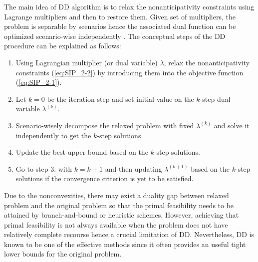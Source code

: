 The main idea of DD algorithm is to relax the nonanticipativity constraints using Lagrange multipliers and then to restore them. Given set of multipliers, the problem is separable by scenarios hence the associated dual function can be optimized scenario-wise independently \cite{journal:CS1999}. The conceptual steps of the DD procedure can be explained as follows:
\begin{enumerate}
	\item Using Lagrangian multiplier (or dual variable) $\lambda$, relax the nonanticipativity constraints (\ref{eq:SIP_2-2}) by introducing them into the objective function (\ref{eq:SIP_2-1}).
	\item Let $k=0$ be the iteration step and set initial value on the $k$-step dual variable $\lambda^{(k)}$.
	\item Scenario-wisely decompose the relaxed problem with fixed $\lambda^{(k)}$ and solve it independently to get the $k$-step solutions.
	\item Update the best upper bound based on the $k$-step solutions.
	\item Go to step 3. with $k=k+1$ and then updating $\lambda^{(k+1)}$ based on the $k$-step solutions if the convergence criterion is yet to be satisfied.
\end{enumerate}
Due to the nonconvexities, there may exist a duality gap between relaxed problem and the original problem so that the primal feasibility needs to be attained by branch-and-bound or heuristic schemes. However, achieving that primal feasibility is not always available when the problem does not have relatively complete recourse hence a crucial limitation of DD. Nevertheless, DD is known to be one of the effective methods since it often provides an useful tight lower bounds for the original problem.

